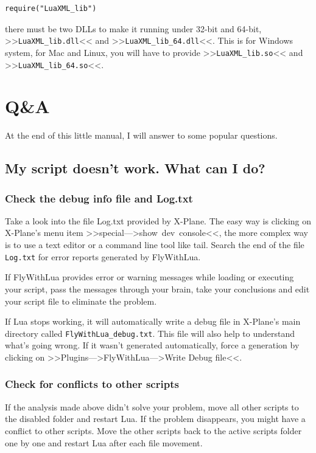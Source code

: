 \documentclass[11pt,parskip=half,a4paper]{scrartcl}
\begin{document}
\begin{lstlisting}[firstnumber=1]
require("LuaXML_lib")
\end{lstlisting}

there must be two DLLs to make it running under 32-bit and 64-bit, >>\verb|LuaXML_lib.dll|<< and >>\verb|LuaXML_lib_64.dll|<<. This is for Windows system, for Mac and Linux, you will have to provide >>\verb|LuaXML_lib.so|<< and >>\verb|LuaXML_lib_64.so|<<.

\newpage
\section{Q\&A}

At the end of this little manual, I will answer to some popular questions.

\subsection{My script doesn't work. What can I do?}

\subsubsection{Check the debug info file and Log.txt}

Take a look into the file Log.txt provided by X-Plane. The easy way is clicking on X-Plane's menu item >>special--->show~dev~console<<, the more complex way is to use a text editor or a command line tool like tail. Search the end of the file \verb|Log.txt| for error reports generated by FlyWithLua.

If FlyWithLua provides error or warning messages while loading or executing your script, pass the messages through your brain, take your conclusions and edit your script file to eliminate the problem.

If Lua stops working, it will automatically write a debug file in X-Plane's main directory called \verb|FlyWithLua_debug.txt|. This file will also help to understand what's going wrong. If it wasn't generated automatically, force a generation by clicking on >>Plugins--->FlyWithLua--->Write Debug file<<.

\subsubsection{Check for conflicts to other scripts}

If the analysis made above didn't solve your problem, move all other scripts to the disabled folder and restart Lua. If the problem disappears, you might have a conflict to other scripts. Move the other scripts back to the active scripts folder one by one and restart Lua after each file movement. 
\end{document}
